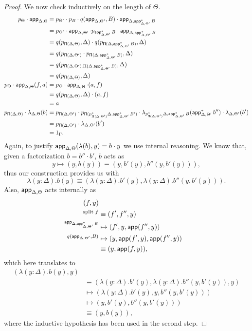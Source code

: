 \begin{proof}
  We now check inductively on the length of $\Theta$.
  \begin{align*}
    p_{\Theta}\cdot\operatorname{\mathsf{app}}_{\Delta,\Theta}
    &=p_{\Theta'}\cdot
    p_B\cdot
    q(\operatorname{\mathsf{app}}_{\Delta,\Theta'},B)\cdot
    \operatorname{\mathsf{app}}_{\Delta,\operatorname{\mathsf{app}}^*_{\Delta,\Theta'}B} \\
    &=p_{\Theta'}\cdot
    \operatorname{\mathsf{app}}_{\Delta,\Theta'}\cdot
    p_{\operatorname{\mathsf{app}}^*_{\Delta,\Theta'}B}\cdot
    \operatorname{\mathsf{app}}_{\Delta,\operatorname{\mathsf{app}}^*_{\Delta,\Theta'}B} \\
    &=q(p_{\operatorname{\mathsf{\Pi}}(\Delta,\Theta)},\Delta)\cdot
    q(p_{\operatorname{\mathsf{\Pi}}(\Delta,\operatorname{\mathsf{app}}^*_{\Delta,\Theta'}B)},\Delta) \\
    &=q(p_{\operatorname{\mathsf{\Pi}}(\Delta,\Theta')}\cdot
    p_{\operatorname{\mathsf{\Pi}}(\Delta,\operatorname{\mathsf{app}}^*_{\Delta,\Theta'}B)},\Delta) \\
    &=q(p_{\operatorname{\mathsf{\Pi}}(\Delta,\Theta').\Pi(\Delta,\operatorname{\mathsf{app}}^*_{\Delta,\Theta'}B)},\Delta) \\
    &=q(p_{\operatorname{\mathsf{\Pi}}(\Delta,\Theta)},\Delta) \\
    p_\Theta\cdot\operatorname{\mathsf{app}}_{\Delta,\Theta}(f,a)
    &=p_\Theta\cdot\operatorname{\mathsf{app}}_{\Delta,\Theta}\cdot(a,f) \\
    &=q(p_{\operatorname{\mathsf{\Pi}}(\Delta,\Theta)},\Delta)\cdot(a,f) \\
    &=a \\
    p_{\operatorname{\mathsf{\Pi}}(\Delta,\Theta)}\cdot
    \lambda_{\Delta,\Theta}(b)
    &=p_{\operatorname{\mathsf{\Pi}}(\Delta,\Theta')}\cdot
    p_{\operatorname{\mathsf{\Pi}}(p_{\Pi(\Delta,\Theta')}^*\Delta,\operatorname{\mathsf{app}}^*_{\Delta,\Theta'}B')}\cdot
    \lambda_{p^*_{\operatorname{\mathsf{\Pi}}(\Delta,\Theta')}\Delta,\operatorname{\mathsf{app}}^*_{\Delta,\Theta'}B}(\operatorname{\mathsf{app}}_{\Delta,\Theta'}^*b'')\cdot
    \lambda_{\Delta,\Theta'}(b') \\
    &=p_{\operatorname{\mathsf{\Pi}}(\Delta,\Theta')}\cdot
    \lambda_{\Delta,\Theta'}(b') \\
    &=1_\Gamma.
  \end{align*}
  Again, to justify
  $\operatorname{\mathsf{app}}_{\Delta,\Theta}(\lambda(b),y)=b\cdot y$ we use internal reasoning.
  We know that, given a factorization $b=b''\cdot b'$, $b$ acts as
  \[y\mapsto(y,b(y))\equiv(y,b'(y),b''(y,b'(y))),\]
  thus our construction provides us with
  \[\lambda(y:\Delta).b(y)\equiv
  (\lambda(y:\Delta).b'(y),\lambda(y:\Delta).b''(y,b'(y))).\]
  Also, $\operatorname{\mathsf{app}}_{\Delta,\Theta}$ acts internally as
  \begin{align*}
    (f,y) \\
    ^{\text{split }f}&\equiv(f',f'',y) \\
    ^{\operatorname{\mathsf{app}}_{\Delta,\operatorname{\mathsf{app}}^*_{\Delta,\Theta'}B}}&\mapsto(f',y,\operatorname{\mathsf{app}}(f'',y)) \\
    ^{q(\operatorname{\mathsf{app}}_{\Delta,\Theta'},B)}&\mapsto(y,\operatorname{\mathsf{app}}(f',y),\operatorname{\mathsf{app}}(f'',y)) \\
    &\equiv(y,\operatorname{\mathsf{app}}(f,y)),
  \end{align*}
  which here translates to
  \begin{align*}
    (\lambda(y:\Delta).b(y),y) \\
    &\equiv(\lambda(y:\Delta).b'(y),\lambda(y:\Delta).b''(y,b'(y)),y) \\
    &\mapsto(\lambda(y:\Delta).b'(y),y,b''(y,b'(y))) \\
    &\mapsto(y,b'(y),b''(y,b'(y))) \\
    &\equiv(y,b(y)),
  \end{align*}
  where the inductive hypothesis has been used in the second step.


\end{proof}
